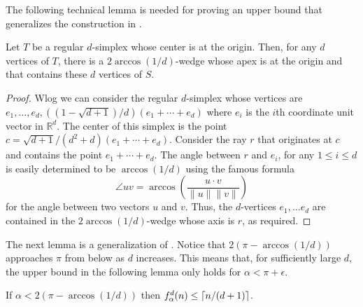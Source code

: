 \documentclass[lotsofwhite]{patmorin}
\newcommand{\R}{\mathbb{R}}
\begin{document}
The following technical lemma is needed for proving an upper bound
that generalizes the construction in .

\begin{lem}
Let $T$ be a regular $d$-simplex whose center is at the origin.  Then,
for any $d$ vertices of $T$, there is a $2\arccos(1/d)$-wedge whose
apex is at the origin and that contains these $d$ vertices of $S$.
\end{lem}

\begin{proof} 
Wlog we can consider the regular $d$-simplex whose vertices are
$e_1,\ldots,e_d, ((1-\sqrt{d+1})/d)(e_1+\cdots+e_d)$ where $e_i$ is the
$i$th coordinate unit vector in $\R^d$.  The center of this
simplex is the point $c=\sqrt{d+1}/(d^2+d)(e_1+\cdots+ e_d)$.
Consider the ray $r$ that originates at $c$ and
contains the point $e_1+\cdots+e_d$.  The angle between $r$ and
$e_i$, for any $1\le i\le d$ is easily determined to be
$\arccos(1/d)$ using the famous formula 
\[
   \angle uv = \arccos \left(\frac{u\cdot v}{\|u\|\|v\|}\right) 
\]
for the angle between two vectors $u$ and $v$.   Thus,
the $d$-vertices $e_1,\ldots e_d$ are contained in the
$2\arccos(1/d)$-wedge whose axis is $r$, as required.
\end{proof}

The next lemma is a generalization of .  Notice that
$2(\pi-\arccos(1/d))$ approaches $\pi$ from below as $d$ increases.  This
means that, for sufficiently large $d$, the upper bound in the
following lemma only holds for $\alpha < \pi+\epsilon$.

\begin{lem}
If $\alpha < 2(\pi-\arccos(1/d))$ then $f^d_\alpha(n) \le \left\lceil n/(d+1) \right\rceil$.
\end{lem}
\end{document}

